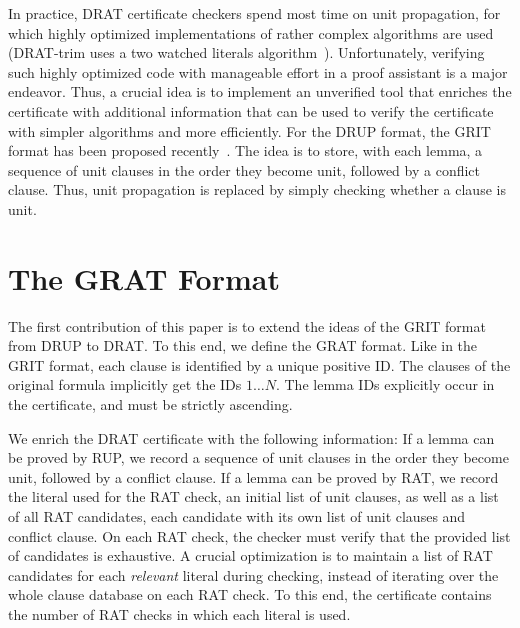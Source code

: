 \documentclass{llncs}
\begin{document}
In practice, DRAT certificate checkers spend most time on unit propagation, for which highly optimized implementations of rather complex algorithms 
are used (\eg DRAT-trim uses a two watched literals algorithm~\cite{MMZZ01}).
Unfortunately, verifying such highly optimized code with manageable effort in a proof assistant is a major endeavor.
Thus, a crucial idea is to implement an unverified tool that enriches the certificate with additional information that can be used to verify 
the certificate with simpler algorithms and more efficiently. For the DRUP format, the GRIT format has been proposed recently~\cite{CMS16}. 
The idea is to store, with each lemma, a sequence of unit clauses in the order they become unit, followed by a conflict clause. Thus, unit propagation is replaced by 
simply checking whether a clause is unit.


\section{The GRAT Format}\label{sec:grat-format}
The first contribution of this paper is to extend the ideas of the GRIT format from DRUP to DRAT.
To this end, we define the GRAT format. 
Like in the GRIT format, each clause is identified by a unique positive ID. 
The clauses of the original formula implicitly get the IDs $1\ldots N$. The lemma IDs explicitly occur in the certificate, and must be strictly ascending.

We enrich the DRAT certificate with the following information: If a lemma can be proved by RUP, we record a sequence of unit clauses in the order they become unit, 
followed by a conflict clause. If a lemma can be proved by RAT, we record the literal used for the RAT check, an initial list of unit clauses, as well as a list of all 
RAT candidates, each candidate with its own list of unit clauses and conflict clause.
On each RAT check, the checker must verify that the provided list of candidates is exhaustive.
A crucial optimization is to maintain a list of RAT candidates for each \emph{relevant} literal during checking, instead of iterating 
over the whole clause database on each RAT check. To this end, the certificate contains the number of RAT checks in which each literal is used.
\end{document}
